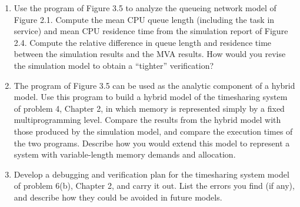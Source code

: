 \begin{enumerate}
\item Use the program of Figure 3.5 to analyze the queueing network model of
Figure 2.1. Compute the mean CPU queue length (including the task in service)
and mean CPU residence time from the simulation report of Figure 2.4. Compute
the relative difference in queue length and residence time between the
simulation results and the MVA results. How would you revise the simulation
model to obtain a ``tighter'' verification?

\item The program of Figure 3.5 can be used as the analytic component of a
hybrid model. Use this program to build a hybrid model of the timesharing
system of problem 4, Chapter 2, in which memory is represented simply by a
fixed multiprogramming level. Compare the results from the hybrid model with
those produced by the simulation model, and compare the execution times of
the two programs. Describe how you would extend this model to represent a
system with variable-length memory demands and allocation.

\item Develop a debugging and verification plan for the timesharing system
model of problem 6(b), Chapter 2, and carry it out. List the errors you find
(if any), and describe how they could be avoided in future models.
\end{enumerate}
